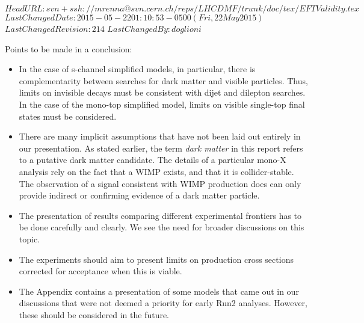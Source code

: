 \svnidlong
{$HeadURL: svn+ssh://mrenna@svn.cern.ch/reps/LHCDMF/trunk/doc/tex/EFTValidity.tex $}
{$LastChangedDate: 2015-05-22 01:10:53 -0500 (Fri, 22 May 2015) $}
{$LastChangedRevision: 214 $}
{$LastChangedBy: doglioni $}

Points to be made in a conclusion:
\begin{itemize}

\item In the case of s-channel simplified models, in particular, there is complementarity between searches for dark matter and visible particles.   Thus, limits on invisible decays must be consistent with dijet and dilepton searches.  In the case of the mono-top simplified model, limits on visible single-top final states must be considered.

\item There are many implicit assumptions that have not been laid out entirely in our presentation.   As stated earlier, the term \textit{dark matter} in this report refers to a putative dark matter candidate.
  The details of a particular mono-X analysis rely on the fact that a
  WIMP exists, and that it is collider-stable.   The observation of a
  signal consistent with WIMP production does can only provide indirect or confirming evidence of a dark matter particle.

\item The presentation of results comparing different experimental frontiers has to be done carefully and clearly.  We see the need for broader discussions on this topic.

\item The experiments should aim to present limits on production cross sections corrected for acceptance when this is viable.  

\item The Appendix contains a presentation of some models that came out in our discussions that were not deemed a priority for early Run2 analyses.  However, these should be considered in the future.



\end{itemize}
